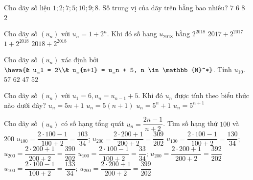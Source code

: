 \begin{ex}%
	Cho dãy số liệu $1; 2; 7; 5; 10; 9; 8$. Số trung vị của  dãy trên bằng bao nhiêu?
	 \choice
		{$ 7  $}
		{\True  $ 6 $}
		{$  8 $}
		{$  2 $ }
\end{ex}

\begin{ex}%
	Cho  dãy số $(u_n)$ với $u_n=1+2^n$. Khi đó số hạng $u_{2018}$ bằng
	 \choice
		{$2^{2018}$} 
		 {$2017+2^{2017}$}
		{\True$1+2^{2018}$} 
		 {$2018+2^{2018}$}
\end{ex}

\begin{ex}%
	Cho dãy  số $(u_n)$ xác định bởi $\heva{& u_1 = 2\\& u_{n+1} = u_n + 5, n \in \mathbb{N}^*}$. Tính $u_{10}$.
	\choice 
		{$57$} 
		{$62$} 
		 {\True $47$}
		 {$52$}
\end{ex}

\begin{ex}%
	Cho dãy số $(u_n)$ với $u_1=6,u_n=u_{n-1}+5$. Khi đó $u_n$ được tính  theo biểu thức nào dưới đây?
	 \choice
		{\True  $u_n=5n+1$}
		 {$u_n=5(n+1)$}
		 {$u_n=5^n+1$}
		 {$u_n=5^{n+1}$}
\end{ex}

\begin{ex}%
	Cho dãy số $(u_n)$ có số hạng tổng quát $u_n=\dfrac{2n-1}{n+2}$. Tìm số hạng thứ  $100$ và $200$
	\choice 
		{$u_{100}=\dfrac{2\cdot100-1}{100+2}=\dfrac{103}{34}$; $u_{200}=\dfrac{2\cdot200+1}{200+2}=\dfrac{309}{202}$} 
		 {$u_{100}=\dfrac{2\cdot100-1}{100+2}=\dfrac{130}{34}$; $u_{200}=\dfrac{2\cdot200+1}{200+2}=\dfrac{390}{202}$}
		{$u_{100}=\dfrac{2\cdot100-1}{100+2}=\dfrac{33}{34}$; $u_{200}=\dfrac{2\cdot200+1}{200+2}=\dfrac{392}{202}$} 
		{\True$u_{100}=\dfrac{2\cdot100-1}{100+2}=\dfrac{133}{34}$; $u_{200}=\dfrac{2\cdot200+1}{200+2}=\dfrac{399}{202}$} 
\end{ex}

